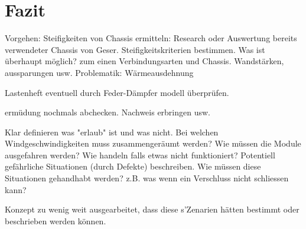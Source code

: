 
\section{Fazit}
\label{Fazit}

Vorgehen:
Steifigkeiten von Chassis ermitteln: Research oder Auswertung bereits verwendeter Chassis von Geser.
Steifigkeitskriterien bestimmen.
Was ist überhaupt möglich? zum einen Verbindungsarten und Chassis. Wandstärken, aussparungen usw.
Problematik: Wärmeausdehnung

Lastenheft eventuell durch Feder-Dämpfer modell überprüfen.

ermüdung nochmals abchecken. Nachweis erbringen usw.

Klar definieren was "erlaub" ist und was nicht. Bei welchen Windgeschwindigkeiten muss zusammengeräumt werden? Wie müssen die Module ausgefahren werden? Wie handeln falls etwas nicht funktioniert? Potentiell gefährliche Situationen (durch Defekte) beschreiben. Wie müssen diese Situationen gehandhabt werden? z.B. was wenn ein Verschluss nicht schliessen kann?

Konzept zu wenig weit ausgearbeitet, dass diese s'Zenarien hätten bestimmt oder beschrieben werden können.

